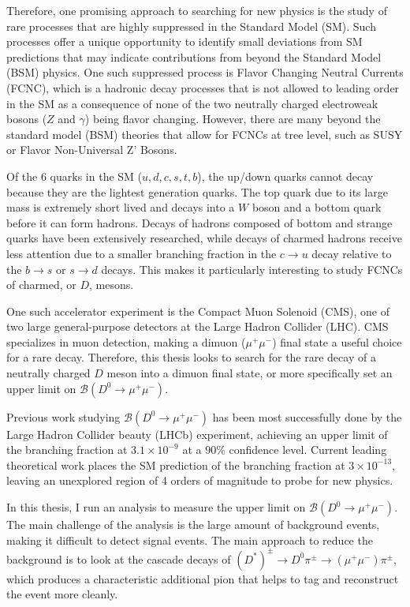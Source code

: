 Therefore, one promising approach to searching for new physics is the study of rare processes that are highly suppressed in the Standard Model (SM). Such processes offer a unique opportunity to identify small deviations from SM predictions that may indicate contributions from beyond the Standard Model (BSM) physics. One such suppressed process is Flavor Changing Neutral Currents (FCNC), which is a hadronic decay processes that is not allowed to leading order in the SM as a consequence of none of the two neutrally charged electroweak bosons ($Z$ and $\gamma$) being flavor changing. However, there are many beyond the standard model (BSM) theories that allow for FCNCs at tree level, such as SUSY or Flavor Non-Universal Z' Bosons.

Of the 6 quarks in the SM ($u,d,c,s,t,b$), the up/down quarks cannot decay because they are the lightest generation quarks. The top quark due to its large mass is extremely short lived and decays into a $W$ boson and a bottom quark before it can form hadrons. Decays of hadrons composed of bottom and strange quarks have been extensively researched, while decays of charmed hadrons receive less attention due to a smaller branching fraction in the $c \to u$ decay relative to the $b\to s$ or $s \to d$ decays. This makes it particularly interesting to study FCNCs of charmed, or $D$, mesons.

One such accelerator experiment is the Compact Muon Solenoid (CMS), one of two large general-purpose detectors at the Large Hadron Collider (LHC). CMS specializes in muon detection, making a dimuon ($\mu^+\mu^-$) final state a useful choice for a rare decay. Therefore, this thesis looks to search for the rare decay of a neutrally charged $D$ meson into a dimuon final state, or more specifically set an upper limit on $\mathcal{B}(D^0 \to \mu^+ \mu^-)$.

Previous work studying $\mathcal{B}(D^0 \to \mu^+ \mu^-)$ has been most successfully done by the Large Hadron Collider beauty (LHCb) experiment, achieving an upper limit of the branching fraction at $3.1\times 10^{-9}$ at a $90\%$ confidence level. Current leading theoretical work places the SM prediction of the branching fraction at $3\times 10^{-13}$, leaving an unexplored region of 4 orders of magnitude to probe for new physics.

In this thesis, I run an analysis to measure the upper limit on $\mathcal{B}(D^0 \to \mu^+ \mu^-)$. The main challenge of the analysis is the large amount of background events, making it difficult to detect signal events. The main approach to reduce the background is to look at the cascade decays of $(D^*)^\pm \to D^0 \pi^\pm \to (\mu^+ \mu^-) \pi^\pm$, which produces a characteristic additional pion that helps to tag and reconstruct the event more cleanly. 

